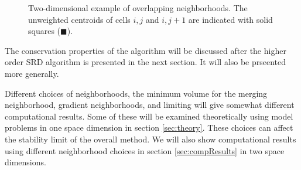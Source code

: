 \begin{figure}
	\hfill
	\caption{\sf Two-dimensional example of overlapping neighborhoods.  The unweighted centroids of cells $i,j$ and $i,j+1$ are indicated with solid squares ($\blacksquare$).} \label{fig:2nborTile}
\end{figure}

The conservation properties of the algorithm will be discussed after the
higher order SRD algorithm is presented in the next
section. It will also be prseented more generally.   

Different choices of neighborhoods, the minimum volume for the merging
neighborhood, gradient neighborhoods, and limiting will give
somewhat different computational results. Some of these will be examined
theoretically using model problems in one space dimension in section
\ref{sec:theory}. These choices can affect the stability limit of the
overall method.
We will also show computational results using different neighborhood
choices in section \ref{sec:compResults} in two space dimensions.

